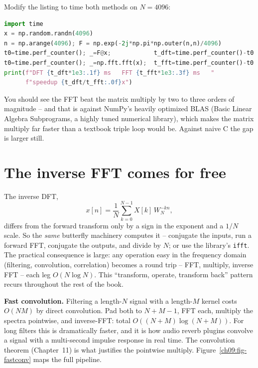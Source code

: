 \begin{labbox}
Modify the listing to time both methods on $N = 4096$:
\begin{lstlisting}[language=Python]
import time
x = np.random.randn(4096)
n = np.arange(4096); F = np.exp(-2j*np.pi*np.outer(n,n)/4096)
t0=time.perf_counter(); _=F@x;            t_dft=time.perf_counter()-t0
t0=time.perf_counter(); _=np.fft.fft(x);  t_fft=time.perf_counter()-t0
print(f"DFT {t_dft*1e3:.1f} ms   FFT {t_fft*1e3:.3f} ms   "
      f"speedup {t_dft/t_fft:.0f}x")
\end{lstlisting}
You should see the FFT beat the matrix multiply by two to three orders of magnitude --
and that is against NumPy's heavily optimized BLAS (Basic Linear Algebra Subprograms, a highly tuned numerical library), which makes the matrix multiply far
faster than a textbook triple loop would be. Against naive C the gap is larger still.
\end{labbox}

\section{The inverse FFT comes for free}
\label{ch09:ifft}

The inverse DFT,
\begin{equation}
\label{ch09:idft}
x[n] = \frac{1}{N}\sum_{k=0}^{N-1} X[k]\,W_N^{-kn},
\end{equation}
differs from the forward transform only by a sign in the exponent and a $1/N$ scale. So
the \emph{same} butterfly machinery computes it -- conjugate the inputs, run a forward
FFT, conjugate the outputs, and divide by $N$; or use the library's
\texttt{ifft}. The practical consequence is large: any operation easy in the frequency
domain (filtering, convolution, correlation) becomes a round trip -- FFT, multiply,
inverse FFT -- each leg $O(N\log N)$. This ``transform, operate, transform back'' pattern
recurs throughout the rest of the book.

\begin{applicationbox}
\textbf{Fast convolution.} Filtering a length-$N$ signal with a length-$M$ kernel costs
$O(NM)$ by direct convolution. Pad both to $N+M-1$, FFT each, multiply the spectra
pointwise, and inverse-FFT: total $O((N+M)\log(N+M))$. For long filters this is
dramatically faster, and it is how audio reverb plugins convolve a signal with a
multi-second impulse response in real time. The convolution theorem (Chapter~11) is
what justifies the pointwise multiply. Figure~\ref{ch09:fig-fastconv} maps the full pipeline.
\end{applicationbox}

